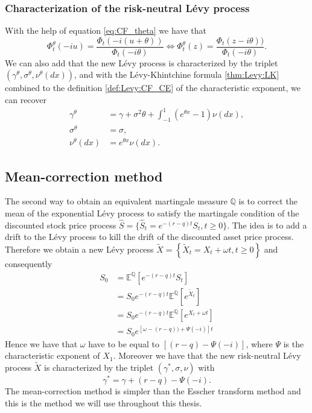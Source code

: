 \subsubsection*{Characterization of the risk-neutral L\'evy process}
With the help of equation \eqref{eq:CF_theta} we have that
$$\Phi_t^{\theta}(-iu) = \frac{\Phi_t(-i(u+\theta))}{\Phi_t(-i\theta)} \Longleftrightarrow \Phi_t^\theta(z)=\frac{\Phi_t(z-i\theta))}{\Phi_t(-i\theta)}.$$
We can also add that the new L\'evy process is characterized by the triplet $(\gamma^\theta,\sigma^\theta, \nu^\theta(dx))$, and with the L\'evy-Khintchine formula \ref{thm:Levy:LK} combined to the definition \eqref{def:Levy:CF_CE} of the characteristic exponent, we can recover
\begin{align*}
\gamma^\theta &= \gamma + \sigma^2 \theta + \int_{-1}^1 \left(e^{\theta x}-1\right)\nu(dx),\\
\sigma^\theta &= \sigma,\\
\nu^\theta(dx)&=e^{\theta x}\nu(dx).
\end{align*}

\subsection{Mean-correction method}
The second way to obtain an equivalent martingale measure $\mathbb{Q}$ is to correct the mean of the exponential L\'evy process to satisfy the martingale condition of the discounted stock price process $\hat{S}=\{\hat{S}_t=e^{-(r-q)t}S_t,t\geq0\}$. The idea is to add a drift to the L\'evy process to kill the drift of the discounted asset price process. Therefore we obtain a new L\'evy process $\tilde{X}=\left\{\tilde{X}_t=X_t+\omega t,t\geq0\right\}$ and consequently
\begin{align*}
S_0 &= \mathbb{E}^\mathbb{Q}\left[e^{-(r-q)t}S_t\right]\\
&= S_0e^{-(r-q)t} \mathbb{E}^\mathbb{Q}\left[e^{\tilde{X}_t}\right]\\
&=  S_0e^{-(r-q)t} \mathbb{E}^\mathbb{Q}\left[e^{X_t+\omega t}\right]\\
&= S_0e^{\left[\omega-(r-q)) + \Psi(-i)\right]t}
\end{align*}
Hence we have that $\omega$ have to be equal to $\left[(r-q)-\Psi(-i)\right]$, where $\Psi$ is the characteristic exponent of $X_1$. Moreover we have that the new risk-neutral L\'evy process $\tilde{X}$ is characterized by the triplet $(\gamma^\ast,\sigma,\nu)$ with
\begin{equation}\label{eq:rn_drift}
\gamma^\ast = \gamma + (r-q) - \Psi(-i).
\end{equation}
The mean-correction method is simpler than the Esscher transform method and this is the method we will use throughout this thesis.
